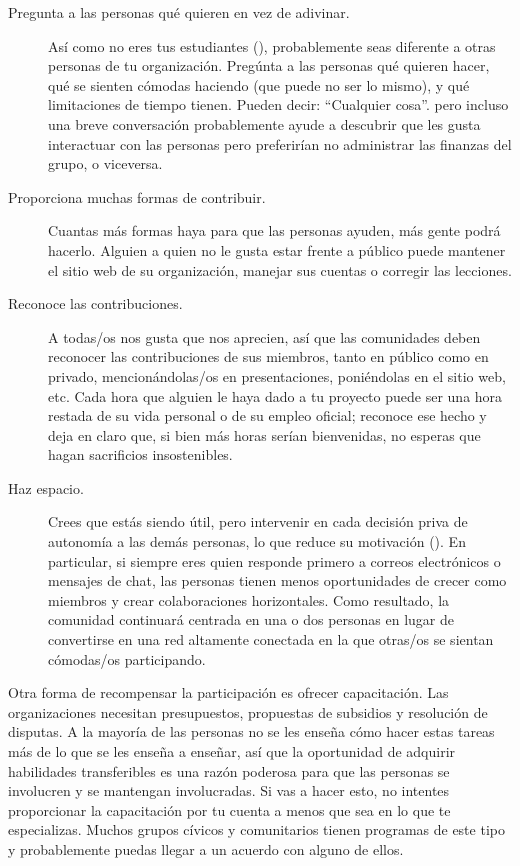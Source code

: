 \begin{description}

\item[Pregunta a las personas qué quieren en vez de adivinar.]
  Así como no eres tus estudiantes (),
  probablemente seas diferente a otras personas de tu organización.
  Pregúnta a las personas qué quieren hacer,
  qué se sienten cómodas haciendo (que puede no ser lo mismo),
  y qué limitaciones de tiempo tienen.
  Pueden decir: ``Cualquier cosa''.
  pero incluso una breve conversación probablemente ayude a descubrir que
  les gusta interactuar con las personas pero preferirían no administrar las finanzas del grupo,
  o viceversa.

\item[Proporciona muchas formas de contribuir.]
    Cuantas más formas haya para que las personas ayuden, más gente podrá hacerlo.
  Alguien a quien no le gusta estar frente a público
  puede mantener el sitio web de su organización,
  manejar sus cuentas
  o corregir las lecciones.

\item[Reconoce las contribuciones.]
  A todas/os nos gusta que nos aprecien,
  así que las comunidades deben reconocer las contribuciones
  de sus miembros, tanto en público como en privado,
  mencionándolas/os en presentaciones,
  poniéndolas en el sitio web, etc.
  Cada hora que alguien le haya dado a tu proyecto
  puede ser una hora restada de su vida personal o de su empleo oficial;
  reconoce ese hecho
  y deja en claro que, si bien más horas serían bienvenidas,
  no esperas que hagan sacrificios insostenibles.

\item[Haz espacio.]
  Crees que estás siendo útil,
  pero intervenir en cada decisión priva de autonomía a las demás personas,
  lo que reduce su motivación ().
  En particular, si siempre eres quien responde primero a correos electrónicos o mensajes de chat,
  las personas tienen menos oportunidades de crecer como miembros
  y crear colaboraciones horizontales.
  Como resultado,
  la comunidad continuará centrada en una o dos personas
  en lugar de convertirse en una red altamente conectada
  en la que otras/os se sientan cómodas/os participando.

\end{description}

Otra forma de recompensar la participación es ofrecer capacitación.
Las organizaciones necesitan presupuestos, propuestas de subsidios y resolución de disputas.
A la mayoría de las personas no se les enseña cómo hacer estas tareas más de lo que se les enseña a enseñar,
así que la oportunidad de adquirir habilidades transferibles
es una razón poderosa para que las personas se involucren y se mantengan involucradas.
Si vas a hacer esto, no intentes proporcionar la capacitación por tu cuenta
a menos que sea en lo que te especializas.
Muchos grupos cívicos y comunitarios tienen programas de este tipo
y probablemente puedas llegar a un acuerdo con alguno de ellos.

